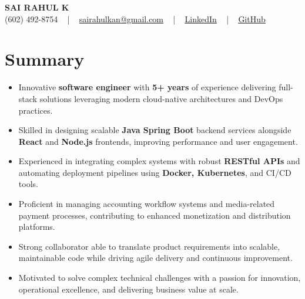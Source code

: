 \documentclass[letterpaper,11pt]{article}
\newcommand{\resumeItem}[1]{
  \item\footnotesize{
    {#1 \vspace{-2pt}}
  }
}
\newcommand{\resumeItemListStart}{\begin{itemize}[leftmargin=*]}
\newcommand{\resumeItemListEnd}{\end{itemize}\vspace{-5pt}}
\begin{document}
\begin{center}
    {\fontsize{14pt}{12pt}\selectfont \textbf{\MakeUppercase{Sai Rahul K}}}\\ \vspace{2pt}
    \fontsize{10pt}{12pt}\selectfont (602) 492-8754 ~ | ~ \href{mailto:sairahulkan@gmail.com}{sairahulkan@gmail.com} ~ | ~
    \href{https://www.linkedin.com/in/rq123/}{\color{blue}\underline{LinkedIn}} ~ | ~
    \href{https://github.com/kanrahuldo}{\color{blue}\underline{GitHub}}~
    \vspace{-8pt}
\end{center}

\section{Summary}
\fontsize{9pt}{10pt}\selectfont
\resumeItemListStart
    \resumeItem{Innovative \textbf{software engineer} with \textbf{5+ years} of experience delivering full-stack solutions leveraging modern cloud-native architectures and DevOps practices.}
    \resumeItem{Skilled in designing scalable \textbf{Java Spring Boot} backend services alongside \textbf{React} and \textbf{Node.js} frontends, improving performance and user engagement.}
    \resumeItem{Experienced in integrating complex systems with robust \textbf{RESTful APIs} and automating deployment pipelines using \textbf{Docker, Kubernetes}, and CI/CD tools.}
    \resumeItem{Proficient in managing accounting workflow systems and media-related payment processes, contributing to enhanced monetization and distribution platforms.}
    \resumeItem{Strong collaborator able to translate product requirements into scalable, maintainable code while driving agile delivery and continuous improvement.}
    \resumeItem{Motivated to solve complex technical challenges with a passion for innovation, operational excellence, and delivering business value at scale.}
\resumeItemListEnd
\vspace{-6pt}
\end{document}
